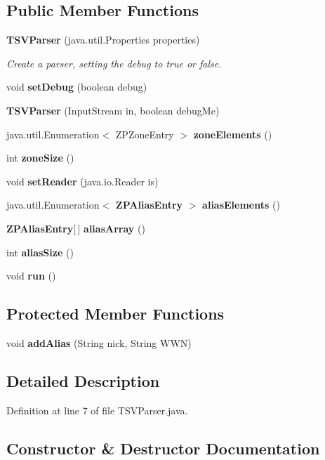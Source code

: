 \subsection*{Public Member Functions}
\begin{DoxyCompactItemize}
\item 
{\bf T\+S\+V\+Parser} (java.\+util.\+Properties properties)
\begin{DoxyCompactList}\small\item\em Create a parser, setting the debug to true or false. \end{DoxyCompactList}\item 
void {\bf set\+Debug} (boolean debug)
\item 
{\bf T\+S\+V\+Parser} (Input\+Stream in, boolean debug\+Me)
\item 
java.\+util.\+Enumeration$<$ Z\+P\+Zone\+Entry $>$ {\bf zone\+Elements} ()
\item 
int {\bf zone\+Size} ()
\item 
void {\bf set\+Reader} (java.\+io.\+Reader is)
\item 
java.\+util.\+Enumeration$<$ {\bf Z\+P\+Alias\+Entry} $>$ {\bf alias\+Elements} ()
\item 
{\bf Z\+P\+Alias\+Entry}[$\,$] {\bf alias\+Array} ()
\item 
int {\bf alias\+Size} ()
\item 
void {\bf run} ()
\end{DoxyCompactItemize}
\subsection*{Protected Member Functions}
\begin{DoxyCompactItemize}
\item 
void {\bf add\+Alias} (String nick, String W\+W\+N)
\end{DoxyCompactItemize}


\subsection{Detailed Description}


Definition at line 7 of file T\+S\+V\+Parser.\+java.



\subsection{Constructor \& Destructor Documentation}
